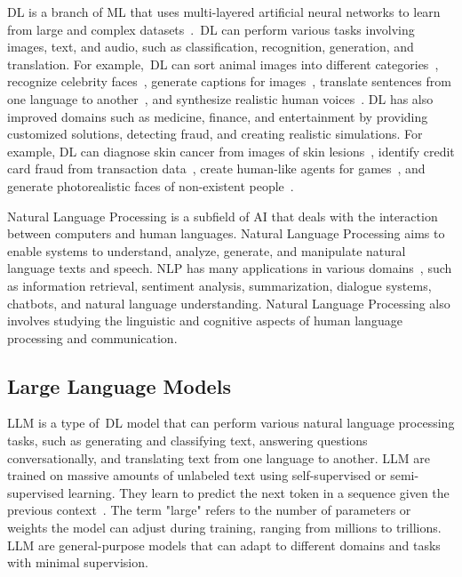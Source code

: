 \ac{DL} is a branch of \ac{ML} that uses multi-layered artificial neural networks to learn from large and complex datasets~\cite{LeCun2015}.~\ac{DL} can perform various tasks involving images, text, and audio, such as classification, recognition, generation, and translation. For example,~\ac{DL} can sort animal images into different categories~\cite{Krizhevsky2017}, recognize celebrity faces~\cite{Schroff2015}, generate captions for images~\cite{Vinyals2015}, translate sentences from one language to another~\cite{Sutskever2014}, and synthesize realistic human voices~\cite{Oord2016}. \ac{DL} has also improved domains such as medicine, finance, and entertainment by providing customized solutions, detecting fraud, and creating realistic simulations. For example, \ac{DL} can diagnose skin cancer from images of skin lesions~\cite{Esteva2017}, identify credit card fraud from transaction data~\cite{Awoyemi2017}, create human-like agents for games~\cite{Silver2017}, and generate photorealistic faces of non-existent people~\cite{Karras2019}.

Natural Language Processing is a subfield of AI that deals with the interaction between computers and human languages. Natural Language Processing aims to enable systems to understand, analyze, generate, and manipulate natural language texts and speech. NLP has many applications in various domains~\cite{Devlin2018}, such as information retrieval, sentiment analysis, summarization, dialogue systems, chatbots, and natural language understanding. Natural Language Processing also involves studying the linguistic and cognitive aspects of human language processing and communication.

\subsection{Large Language Models}\label{sec:llm}

\ac{LLM} is a type of~\ac{DL} model that can perform various natural language processing tasks, such as generating and classifying text, answering questions conversationally, and translating text from one language to another. \ac{LLM} are trained on massive amounts of unlabeled text using self-supervised or semi-supervised learning. They learn to predict the next token in a sequence given the previous context~\cite{Ozdemir2023}. The term "large" refers to the number of parameters or weights the model can adjust during training, ranging from millions to trillions. \ac{LLM} are general-purpose models that can adapt to different domains and tasks with minimal supervision.

